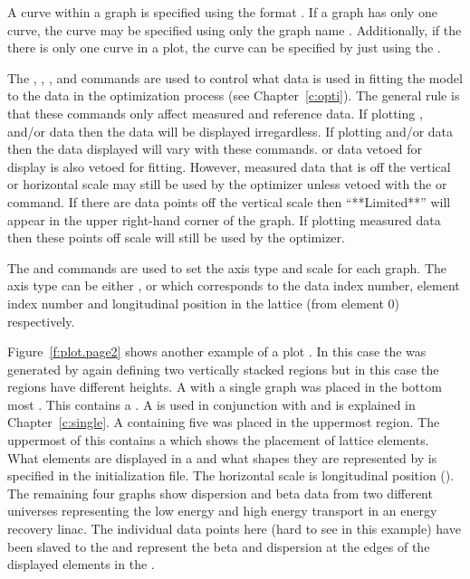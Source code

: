 A curve within a graph is specified using the format
. If a graph has only one curve,
the curve may be specified using only the graph name
. Additionally, if the there is only one
curve in a plot, the curve can be specified by just using the
.

The , , , and  commands are used
to control what data is used in fitting the model to the data in the
optimization process (see Chapter~\ref{c:opti}). The general rule is
that these commands only affect measured and reference data. If
plotting ,  and/or  data then the data
will be displayed irregardless. If plotting  and/or  data
then the data displayed will vary with these commands.   or
 data vetoed for display is also vetoed for fitting.  However,
measured data that is off the vertical or horizontal scale may still be
used by the optimizer unless vetoed with the  or 
command.  If there are data points off the vertical scale then
``**Limited**'' will appear in the upper right-hand corner of the
graph. If plotting measured data then these points off scale will
still be used by the optimizer.

The  and  commands are used to set the axis
type and scale for each graph. The axis type can be either ,
 or  which corresponds to the data index number,
element index number and longitudinal position in the lattice (from
element 0) respectively.

Figure~\ref{f:plot.page2} shows another example of a plot .
In this case the  was generated by again defining two
vertically stacked regions but in this case the regions have different
heights.  A  with a single graph was placed in the
bottom most .  This  contains a .
A  is used in conjunction with  and is
explained in Chapter~\ref{c:single}. A  containing
five  was placed in the uppermost region. The uppermost
 of this  contains a  which
shows the placement of lattice elements.  What elements are displayed
in a  and what shapes they are represented by is
specified in the initialization file. The horizontal scale is
longitudinal position ().  The remaining four graphs show
dispersion and beta data from two different universes representing the
low energy and high energy transport in an energy recovery linac. The
individual data points here (hard to see in this example) have been
slaved to the  and represent the beta and dispersion at
the edges of the displayed elements in the .


